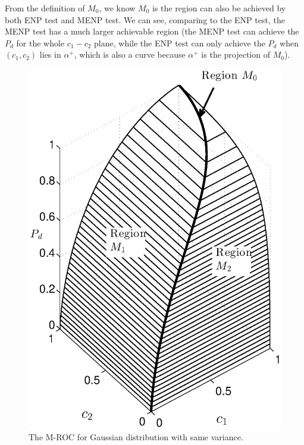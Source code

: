 From the definition of $M_0$, we know $M_0$ is the region can also be achieved by both ENP test and MENP test. We can see, comparing to the ENP test, the MENP test has a much larger achievable region (the MENP test can achieve the $P_d$ for the whole $c_1-c_2$ plane, while the ENP test can only achieve the $P_d$ when $(c_1, c_2)$ lies in $\alpha^+$, which is also a curve because $\alpha^+$ is the projection of $M_0$). 

\begin{figure}[!t]
\centering
\includegraphics[width=12cm, height=16cm]{3/gaussian.eps}
\caption{The M-ROC for Gaussian distribution with same variance.}
\label{pic: surface for same variance}
\end{figure}
